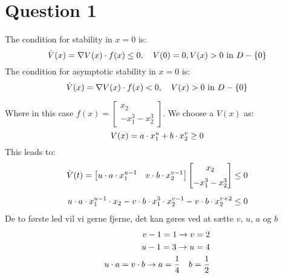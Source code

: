 \chapter{Question 1}

The condition for stability in $x = 0$ is:
\begin{equation}
  \dot{V}(x) = \nabla V(x)\cdot f(x) \leq 0,\quad V(0) = 0, V(x)>0 \text{ in } D - \{0\}
\end{equation}
The condition for asymptotic stability in $x = 0$ is:
\begin{equation}
  \dot{V}(x) = \nabla V(x)\cdot f(x) < 0,\quad  V(x)>0 \text{ in } D - \{0\}
\end{equation}

Where in this case $f(x) = \begin{bmatrix} x_2 \\[2mm] -x_{1}^{3} - x_{2}^3 \end{bmatrix}$. We choose a $V(x)$ as:
\begin{equation}
          V(x) = a \cdot x_{1}^{u} + b \cdot x_{2}^{v} \geq 0
\end{equation}
This leads to:
\begin{equation}
\begin{split}
        \dot{V}(t) = 
        \begin{bmatrix} 
        u \cdot a \cdot x_{1}^{u-1}  & v \cdot b \cdot x_{2}^{v-1} 
        \end{bmatrix}
        \begin{bmatrix} 
        x_2 \\[2mm]
        -x_{1}^{3} - x_{2}^3 
        \end{bmatrix}
        \leq 0 \\[2mm]
        u \cdot a \cdot x_{1}^{u-1} \cdot x_2 - v \cdot b \cdot x_{1}^{3} \cdot x_{2}^{v-1} - v \cdot b \cdot x_{2}^{v+2} \leq 0
\end{split}
\end{equation}
De to første led vil vi gerne fjerne, det kan gøres ved at sætte $v$, $u$, $a$ og $b$
\begin{equation}
\begin{split}
        v-1 = 1 \rightarrow v=2 \\
        u-1 = 3 \rightarrow u=4 \\
        u \cdot a = v \cdot b \rightarrow a=\frac{1}{4} \quad b=\frac{1}{2}
\end{split}
\end{equation}

